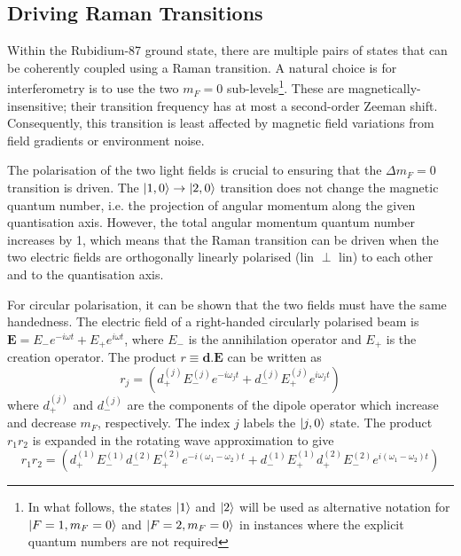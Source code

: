 \subsection{Driving Raman Transitions}\label{subsec:theory_rb87_raman}
Within the Rubidium-87 ground state, there are multiple pairs of
states that can be coherently coupled using a Raman transition.
A natural choice is for interferometry is to use the two $m_F = 0$ sub-levels\footnote{In what follows,
  the states $\ket{1}$ and $\ket{2}$ will be used as alternative
  notation for $\ket{F=1,m_F=0}$ and $\ket{F=2,m_F=0}$ in instances
  where the
explicit quantum numbers are not required}. These
are magnetically-insensitive; their transition frequency has at most a
second-order Zeeman shift. Consequently, this transition is least
affected by magnetic field variations from field gradients or
environment noise. 
\par\noindent
The polarisation of the two light fields is
crucial to ensuring that the $\Delta m_F = 0$ transition is driven.
The $\ket{1,0} \rightarrow \ket{2,0}$ transition does not change the
magnetic quantum number, i.e. the projection of angular momentum
along the given quantisation axis. However, the total angular momentum quantum number
increases by 1, which means that the Raman transition can be driven
when the two electric
fields are orthogonally linearly polarised (lin $\perp$ lin) to each
other and to the quantisation axis. \par\noindent
For circular polarisation, it can be shown that the two fields must
have the same handedness. The electric field of a right-handed
circularly polarised beam is $\textbf{E} = E_- e^{-i \omega t} + E_+
e^{i \omega t}$, where $E_-$ is the annihilation operator and $E_+$ is
the creation operator. The product $r \equiv \textbf{d.E}$
can be written as
\begin{equation}
  \label{eq:dipole_expansion}
  r_j =  
(d^{(j)}_+ E^{(j)}_- e^{-i \omega_j t} + d^{(j)}_- E^{(j)}_+ e^{i
\omega_j t})
\end{equation}
where $d^{(j)}_+$ and $d^{(j)}_-$ are the components of the dipole operator which
increase and decrease $m_F$, respectively. The index $j$ labels
the $\ket{j,0}$ state. The product $r_1 r_2$ is expanded in the
rotating wave approximation to
give
\begin{equation}
  \label{eq:dipole_exp}
r_1 r_2= (d^{(1)}_+ E^{(1)}_- d^{(2)}_- E^{(2)}_+ e^{-i (\omega_1 - \omega_2)
  t} + d^{(1)}_- E^{(1)}_+ d^{(2)}_+ E^{(2)}_-  e^{i(
\omega_1 -\omega_2)t})
\end{equation}
